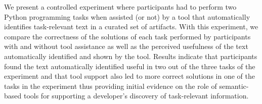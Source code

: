We present a controlled experiment where participants had to 
perform two Python programming tasks when assisted (or not) by a tool that automatically identifies task-relevant text 
in a curated set of artifacts. 
With this experiment, we compare the correctness of the solutions of each task 
performed by participants with and without tool assistance
as well as the perceived usefulness of the text automatically identified and shown by the tool. 
Results indicate that participants found the text automatically identified
useful in two out of the three tasks of the experiment
and that tool support also led to more correct solutions 
in one of the tasks in the experiment thus providing 
initial evidence on the role of semantic-based tools 
for supporting a developer's discovery of task-relevant information.









